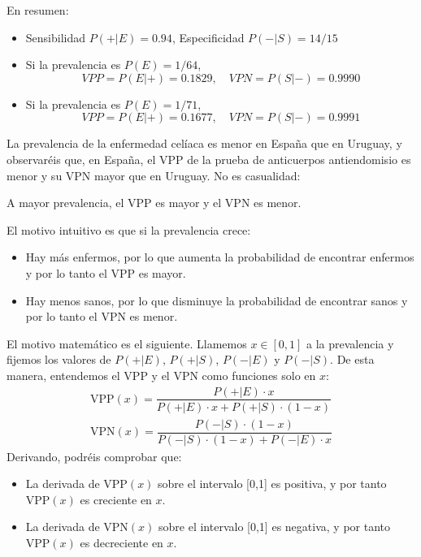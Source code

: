 \documentclass[
]{book}
\providecommand{\tightlist}{%
  \setlength{\itemsep}{0pt}\setlength{\parskip}{0pt}}
\theoremstyle{definition}
\theoremstyle{definition}
\theoremstyle{definition}
\theoremstyle{definition}
\theoremstyle{remark}
\begin{document}
En resumen:

\begin{itemize}
\item
  Sensibilidad \(P(+|E)=0.94\), Especificidad \(P(-|S)=14/15\)
\item
  Si la prevalencia es \(P(E)=1/64\),
  \[
  VPP=P(E|+)=0.1829,\quad
  VPN=P(S|-)=0.9990
  \]
\item
  Si la prevalencia es \(P(E)=1/71\),
  \[
  VPP=P(E|+)=0.1677,\quad
  VPN=P(S|-)=0.9991
  \]
\end{itemize}

La prevalencia de la enfermedad celíaca es menor en España que en Uruguay, y observaréis que, en España, el VPP de la prueba de anticuerpos antiendomisio es menor y su VPN mayor que en Uruguay. No es casualidad:

\begin{rmdimportant}
A mayor prevalencia, el VPP es mayor y el VPN es menor.
\end{rmdimportant}

El motivo intuitivo es que si la prevalencia crece:

\begin{itemize}
\tightlist
\item
  Hay más enfermos, por lo que aumenta la probabilidad de encontrar enfermos y por lo tanto el VPP es mayor.
\item
  Hay menos sanos, por lo que disminuye la probabilidad de encontrar sanos y por lo tanto el VPN es menor.
\end{itemize}

\begin{rmdcorbes}
El motivo matemático es el siguiente. Llamemos \(x\in [0,1]\) a la prevalencia y fijemos los valores de \(P(+|E)\), \(P(+|S)\), \(P(-|E)\) y \(P(-|S)\). De esta manera, entendemos el VPP y el VPN como funciones solo en \(x\):
\[
\begin{array}{l}        
\text{VPP}(x)  =\dfrac{P(+|E)\cdot x}{P(+|E)\cdot x+P(+|S)\cdot (1-x)}\\
\text{VPN}(x) =\dfrac{P(-|S)\cdot (1-x)}{P(-|S)\cdot (1-x)+P(-|E)\cdot x}
\end{array}
\]
Derivando, podréis comprobar que:

\begin{itemize}
\item
  La derivada de \(\text{VPP}(x)\) sobre el intervalo {[}0,1{]} es positiva, y por tanto \(\text{VPP}(x)\) es creciente en \(x\).
\item
  La derivada de \(\text{VPN}(x)\) sobre el intervalo {[}0,1{]} es negativa, y por tanto \(\text{VPP}(x)\) es decreciente en \(x\).
\end{itemize}
\end{rmdcorbes}
\end{document}

